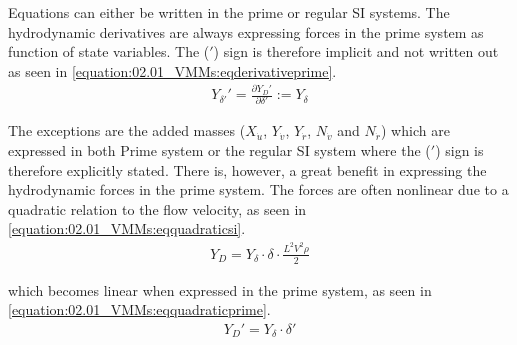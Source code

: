 \documentclass[review]{elsarticle}
\begin{document}
Equations can either be written in the prime or regular SI systems. The hydrodynamic derivatives are always expressing forces in the prime system as function of state variables. The (\('\)) sign is therefore implicit and not written out as seen in \autoref{equation:02.01_VMMs:eqderivativeprime}.
\begin{equation}\label{equation:02.01_VMMs:eqderivativeprime}
\begin{split}\displaystyle Y_{\delta'}'=\frac{\partial Y_D'}{\partial \delta'} := Y_{\delta} \end{split}
\end{equation}
 
The exceptions are the added masses (\(X_{\dot{u}}\), \(Y_{\dot{v}}\), \(Y_{\dot{r}}\), \(N_{\dot{v}}\) and \(N_{\dot{r}}\)) which are expressed in both Prime system or the regular SI system where the (\('\)) sign is therefore
explicitly stated.
There is, however, a great benefit in expressing the hydrodynamic forces in the prime system. The forces are often nonlinear due to a quadratic relation to the flow velocity, as seen in \autoref{equation:02.01_VMMs:eqquadraticsi}.
\begin{equation}\label{equation:02.01_VMMs:eqquadraticsi}
\begin{split}\displaystyle Y_{D}=Y_{\delta} \cdot \delta \cdot \frac{L^2V^2\rho}{2}\end{split}
\end{equation}
 
which becomes linear when expressed in the prime system, as seen in \autoref{equation:02.01_VMMs:eqquadraticprime}.
\begin{equation}\label{equation:02.01_VMMs:eqquadraticprime}
\begin{split}\displaystyle Y_{D}'=Y_{\delta} \cdot \delta'\end{split}
\end{equation}
\end{document}
